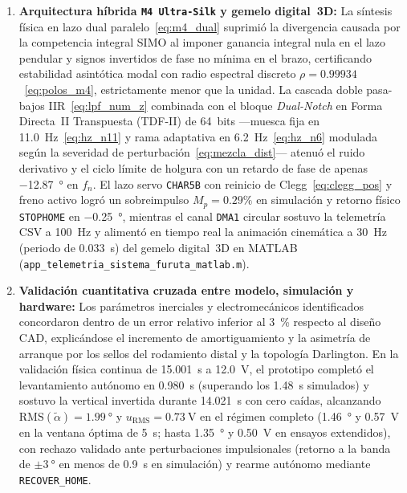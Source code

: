 \begin{enumerate}
    \item \textbf{Arquitectura híbrida \texttt{M4 Ultra-Silk} y gemelo digital~3D:} La síntesis física en lazo dual paralelo~\eqref{eq:m4_dual} suprimió la divergencia causada por la competencia integral SIMO al imponer ganancia integral nula en el lazo pendular y signos invertidos de fase no mínima en el brazo, certificando estabilidad asintótica modal con radio espectral discreto $\rho=0.99934$~\eqref{eq:polos_m4}, estrictamente menor que la unidad. La cascada doble pasa-bajos IIR~\eqref{eq:lpf_num_z} combinada con el bloque \textit{Dual-Notch} en Forma Directa~II Transpuesta (TDF-II) de 64~bits ---muesca fija en \qty{11.0}{\hertz}~\eqref{eq:hz_n11} y rama adaptativa en \qty{6.2}{\hertz}~\eqref{eq:hz_n6} modulada según la severidad de perturbación~\eqref{eq:mezcla_dist}--- atenuó el ruido derivativo y el ciclo límite de holgura con un retardo de fase de apenas \qty{-12.87}{\degree} en $f_n$. El lazo servo \texttt{CHAR5B} con reinicio de Clegg~\eqref{eq:clegg_pos} y freno activo logró un sobreimpulso $M_p=0.29\%$ en simulación y retorno físico \texttt{STOPHOME} en \qty{-0.25}{\degree}, mientras el canal \texttt{DMA1} circular sostuvo la telemetría CSV a \qty{100}{\hertz} y alimentó en tiempo real la animación cinemática a \qty{30}{\hertz} (periodo de \qty{0.033}{\second}) del gemelo digital~3D en MATLAB (\texttt{app\_telemetria\_sistema\_\allowbreak furuta\_matlab.m}).

    \item \textbf{Validación cuantitativa cruzada entre modelo, simulación y hardware:} Los parámetros inerciales y electromecánicos identificados concordaron dentro de un error relativo inferior al \qty{3}{\percent} respecto al diseño CAD, explicándose el incremento de amortiguamiento y la asimetría de arranque por los sellos del rodamiento distal y la topología Darlington. En la validación física continua de \qty{15.001}{\second} a \qty{12.0}{\volt}, el prototipo completó el levantamiento autónomo en \qty{0.980}{\second} (superando los \qty{1.48}{\second} simulados) y sostuvo la vertical invertida durante \qty{14.021}{\second} con cero caídas, alcanzando $\mathrm{RMS}(\tilde{\alpha})=\qty{1.99}{\degree}$ y $u_{\mathrm{RMS}}=\qty{0.73}{\volt}$ en el régimen completo (\qty{1.46}{\degree} y \qty{0.57}{\volt} en la ventana óptima de \qty{5}{\second}; hasta \qty{1.35}{\degree} y \qty{0.50}{\volt} en ensayos extendidos), con rechazo validado ante perturbaciones impulsionales (retorno a la banda de $\pm\qty{3}{\degree}$ en menos de \qty{0.9}{\second} en simulación) y rearme autónomo mediante \texttt{RECOVER\_HOME}.
\end{enumerate}

